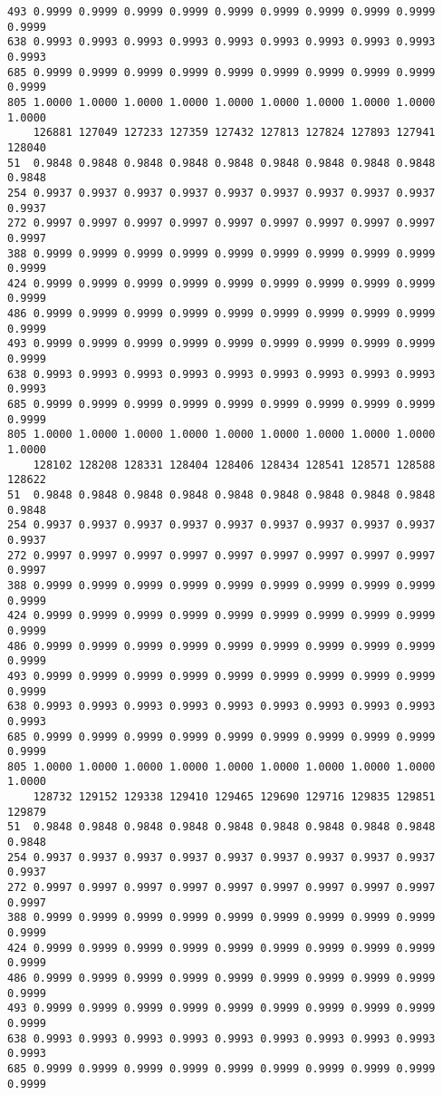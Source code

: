 \documentclass[
]{report}
\begin{document}
\begin{verbatim}
493 0.9999 0.9999 0.9999 0.9999 0.9999 0.9999 0.9999 0.9999 0.9999 0.9999
638 0.9993 0.9993 0.9993 0.9993 0.9993 0.9993 0.9993 0.9993 0.9993 0.9993
685 0.9999 0.9999 0.9999 0.9999 0.9999 0.9999 0.9999 0.9999 0.9999 0.9999
805 1.0000 1.0000 1.0000 1.0000 1.0000 1.0000 1.0000 1.0000 1.0000 1.0000
    126881 127049 127233 127359 127432 127813 127824 127893 127941 128040
51  0.9848 0.9848 0.9848 0.9848 0.9848 0.9848 0.9848 0.9848 0.9848 0.9848
254 0.9937 0.9937 0.9937 0.9937 0.9937 0.9937 0.9937 0.9937 0.9937 0.9937
272 0.9997 0.9997 0.9997 0.9997 0.9997 0.9997 0.9997 0.9997 0.9997 0.9997
388 0.9999 0.9999 0.9999 0.9999 0.9999 0.9999 0.9999 0.9999 0.9999 0.9999
424 0.9999 0.9999 0.9999 0.9999 0.9999 0.9999 0.9999 0.9999 0.9999 0.9999
486 0.9999 0.9999 0.9999 0.9999 0.9999 0.9999 0.9999 0.9999 0.9999 0.9999
493 0.9999 0.9999 0.9999 0.9999 0.9999 0.9999 0.9999 0.9999 0.9999 0.9999
638 0.9993 0.9993 0.9993 0.9993 0.9993 0.9993 0.9993 0.9993 0.9993 0.9993
685 0.9999 0.9999 0.9999 0.9999 0.9999 0.9999 0.9999 0.9999 0.9999 0.9999
805 1.0000 1.0000 1.0000 1.0000 1.0000 1.0000 1.0000 1.0000 1.0000 1.0000
    128102 128208 128331 128404 128406 128434 128541 128571 128588 128622
51  0.9848 0.9848 0.9848 0.9848 0.9848 0.9848 0.9848 0.9848 0.9848 0.9848
254 0.9937 0.9937 0.9937 0.9937 0.9937 0.9937 0.9937 0.9937 0.9937 0.9937
272 0.9997 0.9997 0.9997 0.9997 0.9997 0.9997 0.9997 0.9997 0.9997 0.9997
388 0.9999 0.9999 0.9999 0.9999 0.9999 0.9999 0.9999 0.9999 0.9999 0.9999
424 0.9999 0.9999 0.9999 0.9999 0.9999 0.9999 0.9999 0.9999 0.9999 0.9999
486 0.9999 0.9999 0.9999 0.9999 0.9999 0.9999 0.9999 0.9999 0.9999 0.9999
493 0.9999 0.9999 0.9999 0.9999 0.9999 0.9999 0.9999 0.9999 0.9999 0.9999
638 0.9993 0.9993 0.9993 0.9993 0.9993 0.9993 0.9993 0.9993 0.9993 0.9993
685 0.9999 0.9999 0.9999 0.9999 0.9999 0.9999 0.9999 0.9999 0.9999 0.9999
805 1.0000 1.0000 1.0000 1.0000 1.0000 1.0000 1.0000 1.0000 1.0000 1.0000
    128732 129152 129338 129410 129465 129690 129716 129835 129851 129879
51  0.9848 0.9848 0.9848 0.9848 0.9848 0.9848 0.9848 0.9848 0.9848 0.9848
254 0.9937 0.9937 0.9937 0.9937 0.9937 0.9937 0.9937 0.9937 0.9937 0.9937
272 0.9997 0.9997 0.9997 0.9997 0.9997 0.9997 0.9997 0.9997 0.9997 0.9997
388 0.9999 0.9999 0.9999 0.9999 0.9999 0.9999 0.9999 0.9999 0.9999 0.9999
424 0.9999 0.9999 0.9999 0.9999 0.9999 0.9999 0.9999 0.9999 0.9999 0.9999
486 0.9999 0.9999 0.9999 0.9999 0.9999 0.9999 0.9999 0.9999 0.9999 0.9999
493 0.9999 0.9999 0.9999 0.9999 0.9999 0.9999 0.9999 0.9999 0.9999 0.9999
638 0.9993 0.9993 0.9993 0.9993 0.9993 0.9993 0.9993 0.9993 0.9993 0.9993
685 0.9999 0.9999 0.9999 0.9999 0.9999 0.9999 0.9999 0.9999 0.9999 0.9999

\end{verbatim}
\end{document}
